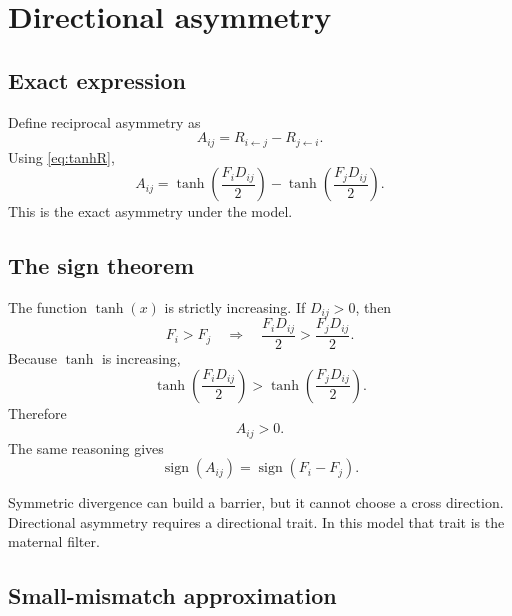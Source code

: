 \documentclass[12pt]{article}
\newcommand{\sign}{\operatorname{sign}}
\begin{document}
\section{Directional asymmetry}

\subsection{Exact expression}

Define reciprocal asymmetry as
\begin{equation}
A_{ij}=R_{i\leftarrow j}-R_{j\leftarrow i}.
\label{eq:Adef}
\end{equation}
Using \eqref{eq:tanhR},
\begin{equation}
A_{ij}=\tanh\left(\frac{F_iD_{ij}}{2}\right)
-
\tanh\left(\frac{F_jD_{ij}}{2}\right).
\label{eq:Aexact}
\end{equation}
This is the exact asymmetry under the model.

\subsection{The sign theorem}

The function $\tanh(x)$ is strictly increasing. If $D_{ij}>0$, then
\begin{equation}
F_i>F_j
\quad \Rightarrow \quad
\frac{F_iD_{ij}}{2}>\frac{F_jD_{ij}}{2}.
\end{equation}
Because $\tanh$ is increasing,
\begin{equation}
\tanh\left(\frac{F_iD_{ij}}{2}\right)>
\tanh\left(\frac{F_jD_{ij}}{2}\right).
\end{equation}
Therefore
\begin{equation}
A_{ij}>0.
\end{equation}
The same reasoning gives
\begin{equation}
\boxed{\sign(A_{ij})=\sign(F_i-F_j)}.
\label{eq:sign}
\end{equation}

\begin{conclusionbox}
Symmetric divergence can build a barrier, but it cannot choose a cross direction. Directional asymmetry requires a directional trait. In this model that trait is the maternal filter.
\end{conclusionbox}

\subsection{Small-mismatch approximation}
\end{document}
